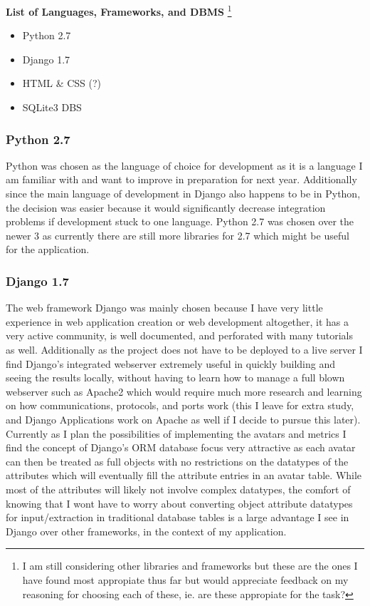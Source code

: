 \documentclass[11pt, a4paper]{article}
\begin{document}
\textbf{List of Languages, Frameworks, and DBMS} \footnote{I am still considering other libraries and frameworks but these are the ones I have found most appropiate thus far but would appreciate feedback on my reasoning for choosing each of these, ie. are these appropiate for the task?}
\begin{itemize}
\item Python 2.7
\item Django 1.7
\item HTML \& CSS (?)
\item SQLite3 DBS
\end{itemize}

\subsubsection{Python 2.7}
Python was chosen as the language of choice for development as it is a language I am familiar with and want to improve in preparation for next year. Additionally since the main language of development in Django also happens to be in Python, the decision was easier because it would significantly decrease integration problems if development stuck to one language. Python 2.7 was chosen over the newer 3 as currently there are still more libraries for 2.7 which might be useful for the application.

\subsubsection{Django 1.7}
The web framework Django was mainly chosen because I have very little experience in web application creation or web development altogether, it has a very active community, is well documented, and perforated with many tutorials as well. Additionally as the project does not have to be deployed to a live server I find Django's integrated webserver extremely useful in quickly building and seeing the results locally, without having to learn how to manage a full blown webserver such as Apache2 which would require much more research and learning on how communications, protocols, and ports work (this I leave for extra study, and Django Applications work on Apache as well if I decide to pursue this later). Currently as I plan the possibilities of implementing the avatars and metrics I find the concept of Django's ORM database focus very attractive as each avatar can then be treated as full objects with no restrictions on the datatypes of the attributes which will eventually fill the attribute entries in an avatar table. While most of the attributes will likely not involve complex datatypes, the comfort of knowing that I wont have to worry about converting object attribute datatypes for input/extraction in traditional database tables is a large advantage I see in Django over other frameworks, in the context of my application.
\end{document}
